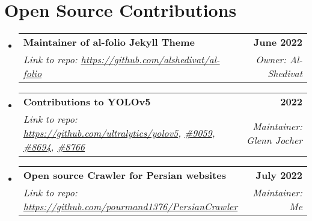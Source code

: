 \documentclass[letterpaper,11pt]{article}
\makeatletter
\newcommand{\resumeSubheading}[4]{
  \vspace{-2pt}\item
    \begin{tabular*}{1.0\textwidth}[t]{l@{\extracolsep{\fill}}r}
      \textbf{#1} & \textbf{\small #2} \\
    \textcolor{sgray} {\textit{\small#3}} & \textcolor{sgray}{ \textit{\small #4} }\\
    \end{tabular*}\vspace{-7pt}
}
\newcommand{\resumeSubHeadingListStart}{\begin{itemize}[leftmargin=0.0in, label={}]}
\newcommand{\resumeSubHeadingListEnd}{\end{itemize}}
\makeatother
\begin{document}

\section{Open Source Contributions}
\resumeSubHeadingListStart
\resumeSubheading
{Maintainer of al-folio Jekyll Theme}{June 2022}
{Link to repo: \url{https://github.com/alshedivat/al-folio} }{Owner: Al-Shedivat}{
	
}
\resumeSubHeadingListEnd



\resumeSubHeadingListStart
\resumeSubheading
{Contributions to YOLOv5}{2022}
{Link to repo: \url{https://github.com/ultralytics/yolov5},
	\href{https://github.com/ultralytics/yolov5/issues/9059}{\#9059},
	\href{https://github.com/ultralytics/yolov5/pull/8694}{\#8694},
	\href{https://github.com/ultralytics/yolov5/pull/8766}{\#8766}  
}{Maintainer: Glenn Jocher}{ 
}
\resumeSubHeadingListEnd

\resumeSubHeadingListStart
\resumeSubheading
{Open source Crawler for Persian websites}{July 2022}
{Link to repo: \url{https://github.com/pourmand1376/PersianCrawler} }{Maintainer: Me}
\resumeSubHeadingListEnd
\end{document}
